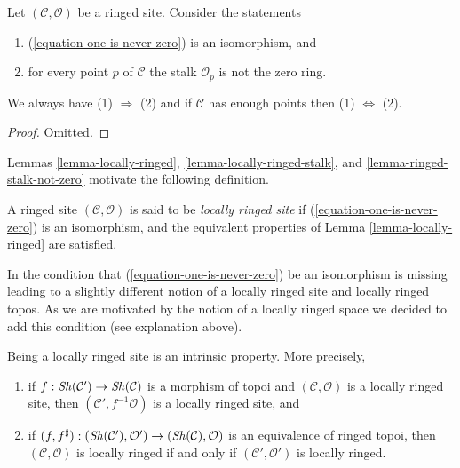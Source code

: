 \begin{lemma}
\label{lemma-ringed-stalk-not-zero}
Let $(\mathcal{C}, \mathcal{O})$ be a ringed site. Consider the statements
\begin{enumerate}
\item (\ref{equation-one-is-never-zero}) is an isomorphism, and
\item for every point $p$ of $\mathcal{C}$ the stalk $\mathcal{O}_p$
is not the zero ring.
\end{enumerate}
We always have (1) $\Rightarrow$ (2) and if $\mathcal{C}$ has enough points
then (1) $\Leftrightarrow$ (2).
\end{lemma}

\begin{proof}
Omitted.
\end{proof}

\noindent
Lemmas \ref{lemma-locally-ringed},
\ref{lemma-locally-ringed-stalk}, and
\ref{lemma-ringed-stalk-not-zero}
motivate the following definition.

\begin{definition}
\label{definition-locally-ringed}
A ringed site $(\mathcal{C}, \mathcal{O})$ is said to be
{\it locally ringed site} if (\ref{equation-one-is-never-zero})
is an isomorphism, and the equivalent properties of
Lemma \ref{lemma-locally-ringed}
are satisfied.
\end{definition}

\noindent
In \cite[Expos\'e IV, Exercice 13.9]{SGA4} the condition that
(\ref{equation-one-is-never-zero}) be an isomorphism is missing leading to
a slightly different notion of a locally ringed site and locally ringed
topos. As we are motivated by the notion of a locally ringed space we decided
to add this condition (see explanation above).

\begin{lemma}
\label{lemma-locally-ringed-intrinsic}
Being a locally ringed site is an intrinsic property.
More precisely,
\begin{enumerate}
\item if $f : \mathop{\mathit{Sh}}\nolimits(\mathcal{C}') \to \mathop{\mathit{Sh}}\nolimits(\mathcal{C})$
is a morphism of topoi and $(\mathcal{C}, \mathcal{O})$ is
a locally ringed site, then $(\mathcal{C}', f^{-1}\mathcal{O})$
is a locally ringed site, and
\item if
$(f, f^\sharp) : (\mathop{\mathit{Sh}}\nolimits(\mathcal{C}'), \mathcal{O}')
\to (\mathop{\mathit{Sh}}\nolimits(\mathcal{C}), \mathcal{O})$
is an equivalence of ringed topoi, then
$(\mathcal{C}, \mathcal{O})$ is locally ringed if and only if
$(\mathcal{C}', \mathcal{O}')$
is locally ringed.
\end{enumerate}
\end{lemma}

